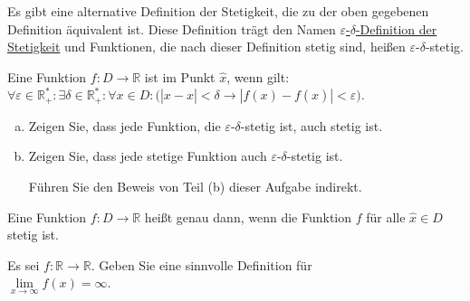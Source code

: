 \noindent
Es gibt eine alternative Definition der Stetigkeit, die zu der oben gegebenen Definition
\"aquivalent ist. Diese Definition tr\"agt den Namen 
\href{http://de.wikipedia.org/wiki/Epsilon-Delta-Kriterium#Stetigkeit_reeller_Funktionen}{$\varepsilon$-$\delta$-Definition der Stetigkeit} 
und Funktionen, die nach dieser Definition stetig sind, hei{\ss}en $\varepsilon$-$\delta$-stetig.

\begin{Definition} 
  Eine Funktion $f:D \rightarrow \mathbb{R}$ ist  im Punkt
  $\widehat{x}$, wenn gilt: 
  \\[0.2cm]
  \hspace*{1.3cm}
  $\forall \varepsilon \in \mathbb{R}_+^*: \exists \delta \in \mathbb{R}_+^*: \forall x \in D: 
   \bigl(|x - \widehat{x}| < \delta \rightarrow |f(x) - f(\widehat{x})| < \varepsilon\bigr)$.
  \eod
\end{Definition}


\exercise
\begin{enumerate}[(a)]
\item Zeigen Sie, dass jede Funktion, die $\varepsilon$-$\delta$-stetig ist,
      auch stetig ist.
\item Zeigen Sie, dass jede stetige Funktion auch $\varepsilon$-$\delta$-stetig ist.

      \hint 
      F\"uhren Sie den Beweis von Teil (b) dieser Aufgabe indirekt.
      \eox
\end{enumerate}


\begin{Definition} \lb
Eine Funktion $f:D \rightarrow \mathbb{R}$ hei{\ss}t  genau dann, wenn
die Funktion $f$ f\"ur alle $\widehat{x} \in D$ stetig ist.
\eod
\end{Definition}

\exercise
Es sei $f: \mathbb{R} \rightarrow \mathbb{R}$.  Geben Sie eine sinnvolle Definition f\"ur 
\\[0.2cm]
\hspace*{1.3cm}
$\lim\limits_{x\rightarrow\infty} f(x) = \infty$.
\eox


